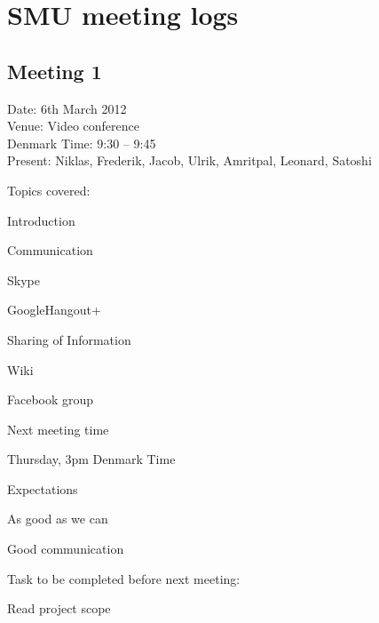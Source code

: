 \chapter{SMU meeting logs}
\label{Appendix_SMU}

\section{Meeting 1}
\label{Appendix_SMU_Meeting1}
Date: 6th March 2012\\
Venue: Video conference\\
Denmark Time: 9:30 – 9:45\\
Present: Niklas, Frederik, Jacob, Ulrik, Amritpal, Leonard, Satoshi

Topics covered:
\begin{my_itemize}
\item Introduction

\item Communication
	\begin{my_itemize}
	\item Skype

	\item GoogleHangout+
	\end{my_itemize}

\item Sharing of Information
	\begin{my_itemize}
	\item Wiki

	\item Facebook group
	\end{my_itemize}

\item Next meeting time
	\begin{my_itemize}
	\item Thursday, 3pm Denmark Time
	\end{my_itemize}

\item Expectations
	\begin{my_itemize}
	\item As good as we can

	\item Good communication
	\end{my_itemize}

\end{my_itemize}

Task to be completed before next meeting:
\begin{my_itemize}
\item Read project scope
\end{my_itemize}

